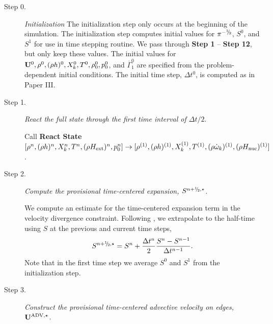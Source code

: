 \documentclass{aastex62}
\newcommand{\sfrac}[2]{\mathchoice
  {\kern0em\raise.5ex\hbox{\the\scriptfont0 #1}\kern-.15em/
   \kern-.15em\lower.25ex\hbox{\the\scriptfont0 #2}}
  {\kern0em\raise.5ex\hbox{\the\scriptfont0 #1}\kern-.15em/
   \kern-.15em\lower.25ex\hbox{\the\scriptfont0 #2}}
  {\kern0em\raise.5ex\hbox{\the\scriptscriptfont0 #1}\kern-.2em/
   \kern-.15em\lower.25ex\hbox{\the\scriptscriptfont0 #2}}
  {#1\!/#2}}
\newcommand{\myhalf}{\sfrac{1}{2}}
\newcommand{\Ub}{{\bf{U}}}
\newcommand{\dt}{\Delta t}
\newcommand{\Hext}{H_{\rm ext}}
\newcommand{\Hnuc}{H_{\rm nuc}}
\newcommand{\omegadot}{\dot\omega}
\newcommand{\nph}{{n+\myhalf}}
\newcommand{\uadvone}{\Ub^{\mathrm{ADV},\star}}
\begin{document}
\begin{description}


\item[Step 0.] {\em Initialization}
The initialization step only occurs at the beginning of the simulation.
The initialization step computes initial values for $\pi^{-\myhalf}$, $S^0$, and
$S^1$ for use in time stepping routine.  We pass through {\bf Step 1} -- {\bf Step 12},
but only keep these values.
The initial values for $\Ub^0, \rho^0, (\rho h)^0, X_k^0, T^0,
\rho_0^0, p_0^0$, and $\overline{\Gamma}_1^0$ are specified from the problem-dependent
initial conditions.  The initial time step, $\dt^0$, is computed as in
Paper III.

\item[Step 1.] {\em React the full state through the first time interval of $\dt / 2.$}

Call {\bf React State}$[\rho^n, (\rho h)^n, X_k^n, T^n, (\rho\Hext)^n, p_0^n] \rightarrow [\rho^{(1)},(\rho h)^{(1)},X_k^{(1)},T^{(1)},(\rho \omegadot_k)^{(1)},(\rho \Hnuc)^{(1)}]$.


\item[Step 2.] {\em Compute the provisional time-centered expansion,
    $S^{\nph,\star}$.}

We compute an estimate for the time-centered expansion term in the velocity
divergence constraint.  Following \citet{Bell:2004}, we extrapolate
to the half-time using $S$ at the previous and current
time steps,
\begin{equation}
S^{\nph,\star} = S^n + \frac{\dt^n}{2} \frac{S^n - S^{n-1}}{\dt^{n-1}}.
\end{equation}
Note that in the first time step we average $S^0$ and $S^1$ from the
initialization step.

\item[Step 3.] {\em Construct the provisional time-centered advective velocity on
edges, $\uadvone$.}


\end{description}
\end{document}
